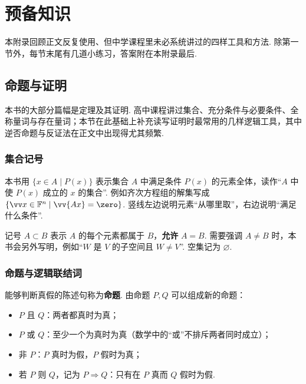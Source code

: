 
\chapter{预备知识}\label{app:prelim}

本附录回顾正文反复使用、但中学课程里未必系统讲过的四样工具和方法. 除第一节外，每节末尾有几道小练习，答案附在本附录最后.

\section{命题与证明}

本书的大部分篇幅是定理及其证明. 高中课程讲过集合、充分条件与必要条件、全称量词与存在量词；本节在此基础上补充读写证明时最常用的几样逻辑工具，其中逆否命题与反证法在正文中出现得尤其频繁.

\subsection{集合记号}

本书用 $\{x\in A\mid P(x)\}$ 表示集合 $A$ 中满足条件 $P(x)$ 的元素全体，读作“$A$ 中使 $P(x)$ 成立的 $x$ 的集合”. 例如齐次方程组的解集写成 $\{\vv x\in\mathbb{F}^n\mid \vv{Ax}=\zero\}$. 竖线左边说明元素“从哪里取”，右边说明“满足什么条件”.

记号 $A\subset B$ 表示 $A$ 的每个元素都属于 $B$，\textbf{允许} $A=B$. 需要强调 $A\ne B$ 时，本书会另外写明，例如“$W$ 是 $V$ 的子空间且 $W\ne V$”. 空集记为 $\varnothing$.

\subsection{命题与逻辑联结词}

能够判断真假的陈述句称为\textbf{命题}. 由命题 $P,Q$ 可以组成新的命题：
\begin{itemize}
	\item $P$ 且 $Q$：两者都真时为真；
	\item $P$ 或 $Q$：至少一个为真时为真（数学中的“或”不排斥两者同时成立）；
	\item 非 $P$：$P$ 真时为假，$P$ 假时为真；
	\item 若 $P$ 则 $Q$，记为 $P\Rightarrow Q$：只有在 $P$ 真而 $Q$ 假时为假.
\end{itemize}

